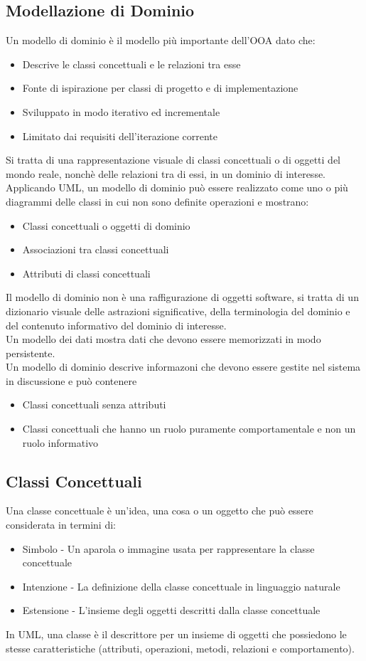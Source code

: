 \subsection*{Modellazione di Dominio}
Un modello di dominio è il modello più importante dell'OOA dato che:
\begin{itemize}
    \item Descrive le classi concettuali e le relazioni tra esse
    \item Fonte di ispirazione per classi di progetto e di implementazione
    \item Sviluppato in modo iterativo ed incrementale
    \item Limitato dai requisiti dell'iterazione corrente
\end{itemize}
Si tratta di una rappresentazione visuale di classi concettuali o di oggetti
del mondo reale, nonchè delle relazioni tra di essi, in un dominio di interesse.
Applicando UML, un modello di dominio può essere realizzato come uno o più diagrammi
delle classi in cui non sono definite operazioni e mostrano:
\begin{itemize}
    \item Classi concettuali o oggetti di dominio
    \item Associazioni tra classi concettuali
    \item Attributi di classi concettuali
\end{itemize}
Il modello di dominio non è una raffigurazione di oggetti software, si tratta
di un dizionario visuale delle astrazioni significative, della terminologia del dominio
e del contenuto informativo del dominio di interesse.
\\ Un modello dei dati mostra dati che devono essere memorizzati in modo persistente.
\\ Un modello di dominio descrive informazoni che devono essere gestite nel sistema in
discussione e può contenere
\begin{itemize}
    \item Classi concettuali senza attributi
    \item Classi concettuali che hanno un ruolo puramente comportamentale e non un
    ruolo informativo
\end{itemize}
\subsection*{Classi Concettuali}
Una classe concettuale è un'idea, una cosa o un oggetto che può essere considerata
in termini di:
\begin{itemize}
    \item Simbolo - Un aparola o immagine usata per rappresentare la classe concettuale
    \item Intenzione - La definizione della classe concettuale in linguaggio naturale
    \item Estensione - L'insieme degli oggetti descritti dalla classe concettuale
\end{itemize}
In UML, una classe è il descrittore per un insieme di oggetti che possiedono le stesse
caratteristiche (attributi, operazioni, metodi, relazioni e comportamento).
